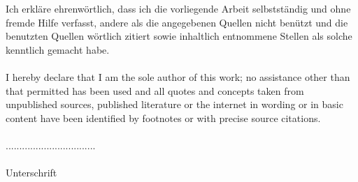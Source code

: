 Ich erkläre ehrenwörtlich, dass ich die vorliegende Arbeit 
selbstständig und ohne fremde Hilfe verfasst, andere als 
die angegebenen Quellen nicht benützt und die benutzten 
Quellen wörtlich zitiert sowie inhaltlich entnommene Stellen 
als solche kenntlich gemacht habe.\paragraph*{}

I hereby declare that I am the sole author of this work; 
no assistance other than that permitted has been used and 
all quotes and concepts taken from unpublished sources, 
published literature or the internet in wording or in basic 
content have been identified by footnotes or with precise 
source citations.\paragraph*{}
.................................\paragraph*{}
Unterschrift